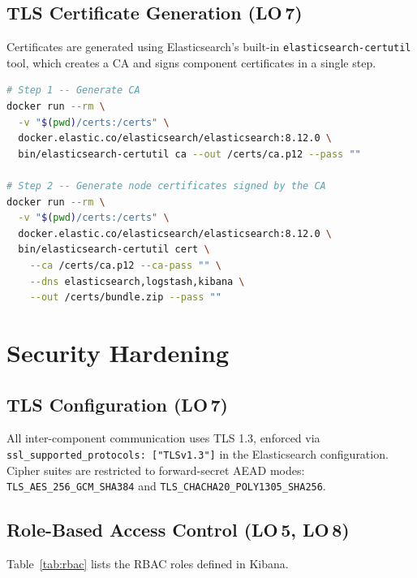 \documentclass[12pt,a4paper]{report}
\begin{document}
\subsection{TLS Certificate Generation (LO\,7)}

Certificates are generated using Elasticsearch's built-in \texttt{elasticsearch-certutil}
tool, which creates a CA and signs component certificates in a single step.

\begin{lstlisting}[language=bash, caption={Certificate generation commands}]
# Step 1 -- Generate CA
docker run --rm \
  -v "$(pwd)/certs:/certs" \
  docker.elastic.co/elasticsearch/elasticsearch:8.12.0 \
  bin/elasticsearch-certutil ca --out /certs/ca.p12 --pass ""

# Step 2 -- Generate node certificates signed by the CA
docker run --rm \
  -v "$(pwd)/certs:/certs" \
  docker.elastic.co/elasticsearch/elasticsearch:8.12.0 \
  bin/elasticsearch-certutil cert \
    --ca /certs/ca.p12 --ca-pass "" \
    --dns elasticsearch,logstash,kibana \
    --out /certs/bundle.zip --pass ""
\end{lstlisting}

\section{Security Hardening}

\subsection{TLS Configuration (LO\,7)}

All inter-component communication uses TLS 1.3, enforced via
\texttt{ssl\_supported\_protocols: ["TLSv1.3"]} in the Elasticsearch configuration.
Cipher suites are restricted to forward-secret AEAD modes:
\texttt{TLS\_AES\_256\_GCM\_SHA384} and \texttt{TLS\_CHACHA20\_POLY1305\_SHA256}.

\subsection{Role-Based Access Control (LO\,5, LO\,8)}

Table~\ref{tab:rbac} lists the RBAC roles defined in Kibana.
\end{document}

